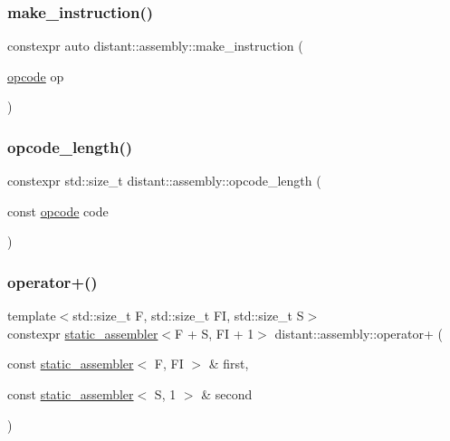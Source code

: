 \subsubsection{\texorpdfstring{make\+\_\+instruction()}{make\_instruction()}\hspace{0.1cm}{\footnotesize\ttfamily [2/2]}}
{\footnotesize\ttfamily constexpr auto distant\+::assembly\+::make\+\_\+instruction (\begin{DoxyParamCaption}\item[{\mbox{\hyperlink{namespacedistant_1_1assembly_a64d7b047d9e3df1ac04919f7c4f8f6fa}{opcode}}}]{op }\end{DoxyParamCaption})\hspace{0.3cm}{\ttfamily [noexcept]}}

\mbox{\label{namespacedistant_1_1assembly_a909ebf61cf8020faecaabd9b873f7da4}} 
\subsubsection{\texorpdfstring{opcode\+\_\+length()}{opcode\_length()}}
{\footnotesize\ttfamily constexpr std\+::size\+\_\+t distant\+::assembly\+::opcode\+\_\+length (\begin{DoxyParamCaption}\item[{const \mbox{\hyperlink{namespacedistant_1_1assembly_a64d7b047d9e3df1ac04919f7c4f8f6fa}{opcode}}}]{code }\end{DoxyParamCaption})\hspace{0.3cm}{\ttfamily [noexcept]}}

\mbox{\label{namespacedistant_1_1assembly_a1fc4551ec9708ff19592019305e09983}} 
\subsubsection{\texorpdfstring{operator+()}{operator+()}}
{\footnotesize\ttfamily template$<$std\+::size\+\_\+t F, std\+::size\+\_\+t FI, std\+::size\+\_\+t S$>$ \\
constexpr \mbox{\hyperlink{classdistant_1_1assembly_1_1static__assembler}{static\+\_\+assembler}}$<$F + S, FI + 1$>$ distant\+::assembly\+::operator+ (\begin{DoxyParamCaption}\item[{const \mbox{\hyperlink{classdistant_1_1assembly_1_1static__assembler}{static\+\_\+assembler}}$<$ F, FI $>$ \&}]{first,  }\item[{const \mbox{\hyperlink{classdistant_1_1assembly_1_1static__assembler}{static\+\_\+assembler}}$<$ S, 1 $>$ \&}]{second }\end{DoxyParamCaption})\hspace{0.3cm}{\ttfamily [noexcept]}}

